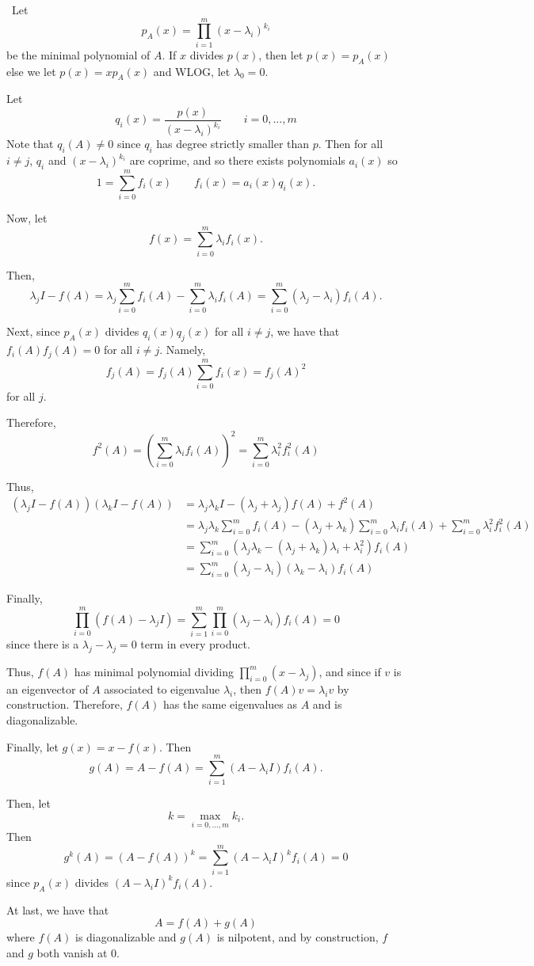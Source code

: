 \documentclass[12pt]{Qual}
\begin{document}
\begin{solution}$\,$
Let $$p_A(x)=\prod_{i=1}^m(x-\lambda_i)^{k_i}$$ be the minimal polynomial of $A$. If $x$ divides $p(x)$, then let $p(x)=p_A(x)$ else we let $p(x)=xp_A(x)$ and WLOG, let $\lambda_0=0$.

Let $$q_i(x)=\frac{p(x)}{(x-\lambda_i)^{k_i}}\qquad i=0,...,m$$ Note that $q_i(A)\not=0$ since $q_i$ has degree strictly smaller than $p$. Then for all $i\not=j$, $q_i$ and $(x-\lambda_i)^{k_i}$ are coprime, and so there exists polynomials $a_i(x)$ so $$1=\sum_{i=0}^mf_i(x)\qquad f_i(x)=a_i(x)q_i(x).$$

Now, let $$f(x)=\sum_{i=0}^m\lambda_if_i(x).$$

Then, $$\lambda_jI-f(A)=\lambda_j\sum_{i=0}^mf_i(A)-\sum_{i=0}^m\lambda_if_i(A)=\sum_{i=0}^m(\lambda_j-\lambda_i)f_i(A).$$

Next, since $p_A(x)$ divides $q_i(x)q_j(x)$ for all $i\not=j$, we have that $f_i(A)f_j(A)=0$ for all $i\not=j$. Namely, $$f_j(A)=f_j(A)\sum_{i=0}^mf_i(x)=f_j(A)^2$$ for all $j$.

Therefore, $$f^2(A)=\left(\sum_{i=0}^m\lambda_if_i(A)\right)^2=\sum_{i=0}^m\lambda_i^2f_i^2(A)$$

Thus, \begin{align*}
    (\lambda_jI-f(A))(\lambda_kI-f(A))&=\lambda_j\lambda_kI-(\lambda_j+\lambda_j)f(A)+f^2(A)\\
    &=\lambda_j\lambda_k\sum_{i=0}^mf_i(A)-(\lambda_j+\lambda_k)\sum_{i=0}^m\lambda_if_i(A)+\sum_{i=0}^m\lambda_i^2f_i^2(A)\\
    &=\sum_{i=0}^m(\lambda_j\lambda_k-(\lambda_j+\lambda_k)\lambda_i+\lambda_i^2)f_i(A)\\
    &=\sum_{i=0}^m(\lambda_j-\lambda_i)(\lambda_k-\lambda_i)f_i(A)
\end{align*}

Finally, $$\prod_{i=0}^m(f(A)-\lambda_jI)=\sum_{i=1}^m\prod_{i=0}^m(\lambda_j-\lambda_i)f_i(A)=0$$ since there is a $\lambda_j-\lambda_j=0$ term in every product.

Thus, $f(A)$ has minimal polynomial dividing $\prod_{i=0}^m(x-\lambda_j)$, and since if $v$ is an eigenvector of $A$ associated to eigenvalue $\lambda_i$, then $f(A)v=\lambda_iv$ by construction. Therefore, $f(A)$ has the same eigenvalues as $A$ and is diagonalizable.

Finally, let $g(x)=x-f(x)$. Then $$g(A)=A-f(A)=\sum_{i=1}^m(A-\lambda_iI)f_i(A).$$

Then, let $$k=\max_{i=0,...,m}k_i.$$ Then $$g^k(A)=(A-f(A))^k=\sum_{i=1}^m(A-\lambda_iI)^kf_i(A)=0$$ since $p_A(x)$ divides $(A-\lambda_iI)^kf_i(A)$.

At last, we have that $$A=f(A)+g(A)$$ where $f(A)$ is diagonalizable and $g(A)$ is nilpotent, and by construction, $f$ and $g$ both vanish at $0.$
\end{solution}
\newpage
\end{document}
